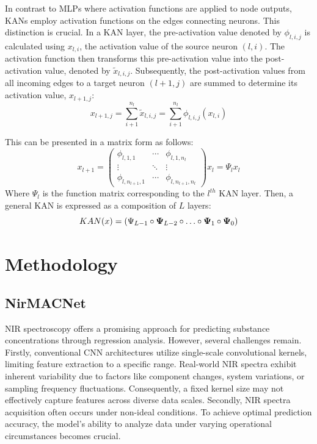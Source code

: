 \documentclass[10pt, a4paper, oneside]{article}
\begin{document}
In contrast to MLPs where activation functions are applied to node outputs, KANs employ activation functions on the edges connecting neurons. This distinction is crucial. In a KAN layer, the pre-activation value denoted by $\phi_{l, i, j}$ is calculated using $x_{l, i}$, the activation value of the source neuron $(l, i)$. The activation function then transforms this pre-activation value into the post-activation value, denoted by $\tilde{x}_{l, i,j}$. Subsequently, the post-activation values from all incoming edges to a target neuron $(l + 1,j)$ are summed to determine its activation value, $x_{l+1,j}$:
\begin{equation}
    x_{l+1,j} = \sum_{i+1}^{n_l} \tilde{x}_{l,i,j} = \sum_{i+1}^{n_l} \phi_{l, i, j}(x_{l,i})
\end{equation}

This can be presented in a matrix form as follows:
\begin{equation}
    x_{l+1} = \begin{pmatrix} \phi_{l, 1, 1} & \cdots & \phi_{l, 1, n_l} \\
                              \vdots & \ddots & \vdots \\
                              \phi_{l, n_{l+1}, 1} & \cdots & \phi_{l, n_{l+1}, n_l}
    \end{pmatrix} x_l = \Psi_lx_l 
\end{equation}
Where $\Psi_l$ is the function matrix corresponding to the $l^{th}$ KAN layer. Then, a general KAN is expressed as a composition of $L$ layers:
\begin{equation}
    KAN(x) = (\Psi_{L-1} \circ \bold{\Psi}_{L-2} \circ \ldots \circ \bold{\Psi}_{1} \circ \bold{\Psi}_{0})
\end{equation}

\section{Methodology}\label{sec3}
\subsection{NirMACNet}\label{sec3.1}
NIR spectroscopy offers a promising approach for predicting substance concentrations through regression analysis. However, several challenges remain. Firstly, conventional CNN architectures utilize single-scale convolutional kernels, limiting feature extraction to a specific range. Real-world NIR spectra exhibit inherent variability due to factors like component changes, system variations, or sampling frequency fluctuations. Consequently, a fixed kernel size may not effectively capture features across diverse data scales. Secondly, NIR spectra acquisition often occurs under non-ideal conditions. To achieve optimal prediction accuracy, the model's ability to analyze data under varying operational circumstances becomes crucial.
\end{document}

